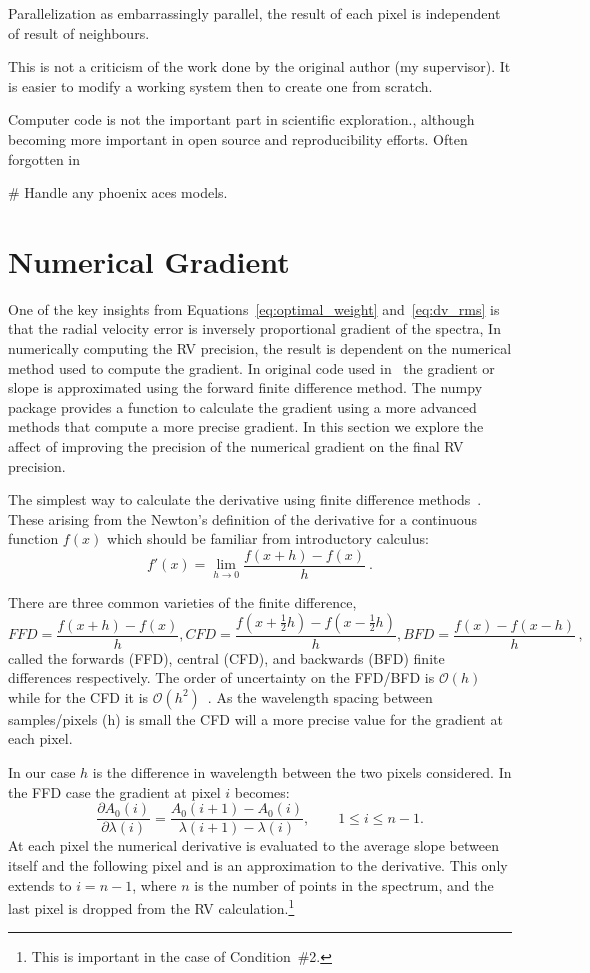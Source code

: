 Parallelization as embarrassingly parallel, the result of each pixel is independent of result of neighbours.

This is not a criticism of the work done by the original author (my supervisor). It is easier to modify a working system then to create one from scratch.

Computer code is not the important part in scientific exploration., although becoming more important in open source and reproducibility efforts. Often forgotten in

\# Handle any phoenix aces models.


\section{Numerical Gradient}
\label{sec:numerical_gradient}
One of the key insights from Equations~\ref{eq:optimal_weight} and~\ref{eq:dv_rms} is that the radial velocity error is inversely proportional gradient of the spectra, In numerically computing the {RV} precision, the result is dependent on the numerical method used to compute the gradient.
In original code used in~\citet{figueira_radial_2016} the gradient or slope is approximated using the forward finite difference method. The numpy package provides a function to calculate the gradient using a more advanced methods that compute a more precise gradient. In this section we explore the affect of improving the precision of the numerical gradient on the final {RV} precision.

The simplest way to calculate the derivative using finite difference methods~\citep{quarteroni_numerical_2000}. These arising from the Newton's definition of the derivative for a continuous function \(f(x)\) which should be familiar from introductory calculus:
\[f'(x) = \lim_{h \to 0} \frac{f(x+h)-f(x)}{h}~.\]

There are three common varieties of the finite difference,
 \[{FFD} = \frac{f(x+h)-f(x)}{h},  {CFD}=\frac{f(x+\frac{1}{2}h)-f(x-\frac{1}{2}h)}{h}, {BFD}=\frac{f(x)-f(x-h)}{h}\,,\] called the forwards ({FFD}), central ({CFD}), and backwards ({BFD}) finite differences respectively. The order of uncertainty on the {FFD}/{BFD} is \(\mathcal{O}(h)\) while for the {CFD} it is \(\mathcal{O}(h^{2})\)~\citep{quarteroni_numerical_2000}. As the wavelength spacing between samples/pixels (h) is small the {CFD} will a more precise value for the gradient at each pixel.

In our case \(h\) is the difference in wavelength between the two pixels considered. In the {FFD} case the gradient at pixel \(i\) becomes:
\begin{equation}
\frac{\partial A_0(i)}{\partial\lambda(i)} = \frac{A_0(i+1) - A_0(i)}{\lambda(i+1)-\lambda(i)}, \hspace{2em} 1 \leq i \leq n-1.
\label{eq:ffd_precision}
\end{equation}
At each pixel the numerical derivative is evaluated to the average slope between itself and the following pixel and is an approximation to the derivative. This only extends to \(i= n-1\), where \(n\) is the number of points in the spectrum, and the last pixel is dropped from the {RV} calculation.\footnote{This is important in the case of Condition~\#2.}


